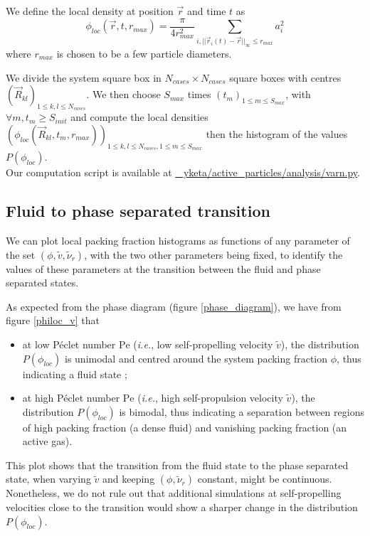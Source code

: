 \documentclass[class=report, float=false, crop=false]{standalone}
\begin{document}
We define the local density at position $\vec{r}$ and time $t$ as
\begin{equation}
\phi_{loc}(\vec{r}, t, r_{max}) = \frac{\pi}{4r_{max}^2} \sum_{i, ||\vec{r}_i(t) - \vec{r}||_{\infty} \leq r_{max}} a_i^2
\label{philoc}
\end{equation}
where $r_{max}$ is chosen to be a few particle diameters.


We divide the system square box in $N_{cases} \times N_{cases}$ square boxes with centres $(\vec{R}_{kl})_{1 \leq k, l \leq N_{cases}}$. We then choose $S_{max}$ times $(t_m)_{1 \leq m \leq S_{max}}$, with $\forall m, t_m \geq S_{init}$ and compute the local densities $(\phi_{loc}(\vec{R}_{kl}, t_m, r_{max}))_{1 \leq k, l \leq N_{cases}, 1 \leq m \leq S_{max}}$ then the histogram of the values $P(\phi_{loc})$.\\

Our computation script is available at \href{https://github.com/yketa/active_particles/blob/master/analysis/varn.py}{{\faGithub~ yketa/active\_particles/analysis/varn.py}}.

\subsection{Fluid to phase separated transition}

We can plot local packing fraction histograms as functions of any parameter of the set $(\phi, \tilde{v}, \tilde{\nu}_r)$, with the two other parameters being fixed, to identify the values of these parameters at the transition between the fluid and phase separated states.


As expected from the phase diagram (figure \ref{phase_diagram}), we have from figure \ref{philoc_v} that
\begin{itemize}
  \item at low P\'eclet number $\text{Pe}$ (\textit{i.e.}, low self-propelling velocity $\tilde{v}$), the distribution $P(\phi_{loc})$ is unimodal and centred around the system packing fraction $\phi$, thus indicating a fluid state ;
  \item at high P\'eclet number $\text{Pe}$ (\textit{i.e.}, high self-propulsion velocity $\tilde{v}$), the distribution $P(\phi_{loc})$ is bimodal, thus indicating a separation between regions of high packing fraction (a dense fluid) and vanishing packing fraction (an active gas).
\end{itemize}
This plot shows that the transition from the fluid state to the phase separated state, when varying $\tilde{v}$ and keeping $(\phi, \tilde{\nu}_r)$ constant, might be continuous. Nonetheless, we do not rule out that additional simulations at self-propelling velocities close to the transition would show a sharper change in the distribution $P(\phi_{loc})$.
\end{document}
